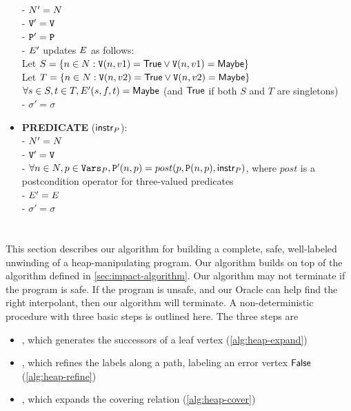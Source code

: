 \begin{itemize}
    - $N' = N$ \\
    - $\mathtt{V}' = \mathtt{V}$ \\
    - $\mathtt{P}' = \mathtt{P}$ \\
    - $E'$ updates $E$ as follows: \\
      \hspace*{1em} Let $S = \{n \in N : \mathtt{V}(n, v1) = \mathsf{True} \vee \mathtt{V}(n, v1) = \mathsf{Maybe}\}$ \\
      \hspace*{1em} Let $T = \{n \in N : \mathtt{V}(n, v2) = \mathsf{True} \vee \mathtt{V}(n, v2) = \mathsf{Maybe}\}$ \\
      \hspace*{1em} $\forall s \in S, t \in T, E'(s,f,t) = \mathsf{Maybe}$ (and $\mathsf{True}$ if both $S$ and $T$ are singletons) \\
    - $\sigma' = \sigma$
  \item \textbf{PREDICATE} ($\mathsf{instr}_P$): \\
    - $N' = N$ \\
    - $\mathtt{V}' = \mathtt{V}$ \\
    - $\forall n \in N, p \in \mathtt{Vars}_P, \mathtt{P}'(n,p) = post(p, \mathtt{P}(n,p), \mathsf{instr}_P)$, where $post$ is a postcondition operator for three-valued predicates \\
    - $E' = E$ \\
    - $\sigma' = \sigma$
\end{itemize}

\section{\verifier}
This section describes our algorithm for building a complete, safe, well-labeled unwinding of a heap-manipulating program. Our algorithm builds on top of the \impact algorithm defined in \autoref{sec:impact-algorithm}. Our algorithm may not terminate if the program is safe. If the program is unsafe, and our Oracle can help find the right interpolant, then our algorithm will terminate. A non-deterministic procedure with three basic steps is outlined here. The three steps are

\begin{itemize}
  \item \expand, which generates the successors of a leaf vertex (\autoref{alg:heap-expand})
  \item {}, which refines the labels along a path, labeling an error vertex $\mathsf{False}$ (\autoref{alg:heap-refine})
  \item \cover, which expands the covering relation (\autoref{alg:heap-cover})
\end{itemize}

